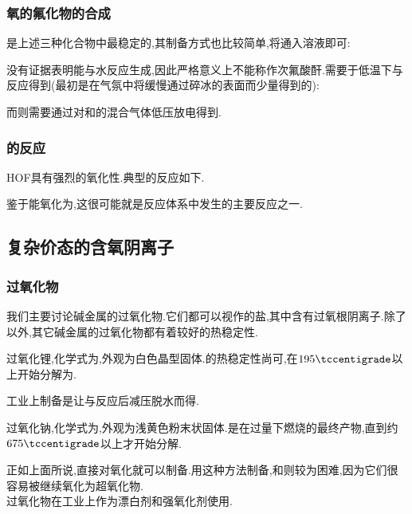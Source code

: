 \documentclass{ctexart}
\begin{document}
\subsubsection{氧的氟化物的合成} 是上述三种化合物中最稳定的,其制备方式也比较简单,将通入溶液即可:
\begin{center}
\end{center}

\indent 没有证据表明能与水反应生成,因此严格意义上不能称作次氟酸酐.需要于低温下与反应得到(最初是在气氛中将缓慢通过碎冰的表面而少量得到的):
\begin{center}
\end{center}
\indent 而则需要通过对和的混合气体低压放电得到.
\subsubsection{的反应}
HOF具有强烈的氧化性.典型的反应如下.
\begin{center}
\end{center}
鉴于能氧化为,这很可能就是反应体系中发生的主要反应之一.
\subsection{复杂价态的含氧阴离子}
\subsubsection{过氧化物}
我们主要讨论碱金属的过氧化物.它们都可以视作的盐,其中含有过氧根阴离子.除了以外,其它碱金属的过氧化物都有着较好的热稳定性.
\begin{substance}[\ce{Li2O2}]
    过氧化锂,化学式为,外观为白色晶型固体.的热稳定性尚可,在$195\tccentigrade$以上开始分解为.
\end{substance}
工业上制备是让与反应后减压脱水而得.
\begin{substance}[\ce{Na2O2}]
    过氧化钠,化学式为,外观为浅黄色粉末状固体.是在过量下燃烧的最终产物,直到约$675\tccentigrade$以上才开始分解.
\end{substance}
正如上面所说,直接对氧化就可以制备.用这种方法制备,和则较为困难,因为它们很容易被继续氧化为超氧化物.\\
\indent 过氧化物在工业上作为漂白剂和强氧化剂使用.
\end{document}
